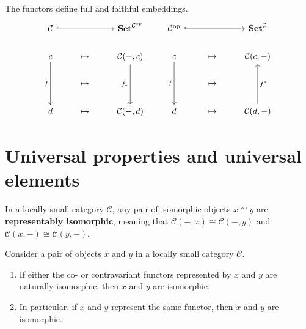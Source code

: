 \documentclass[12pt, oneside]{book}
\begin{document}
\begin{corollary}
    The functors define full and faithful embeddings.
    \begin{equation*}
        \begin{tikzcd}
            \mathcal{C} \arrow[rr,hook, ""] & & \mathbf{Set}^{\mathcal{C}^{\mathrm{op}}} \\
            c \arrow[dd, "f"']    & \mapsto & \mathcal{C}(-, c) \arrow[dd, "f_*"']\\
            & \mapsto & \\
            d          &  \mapsto & \mathcal{C}(-, d)
        \end{tikzcd}
        \quad \quad
        \begin{tikzcd}
            \mathcal{C}^{\mathrm{op}} \arrow[rr,hook, ""] & & \mathbf{Set}^{\mathcal{C}} \\
            c \arrow[dd, "f"']    & \mapsto & \mathcal{C}(c, -) \\
            & \mapsto & \\
            d          &  \mapsto & \mathcal{C}(d, -)\arrow[uu, "f^*"']
        \end{tikzcd}
    \end{equation*}
\end{corollary}












\section{Universal properties and universal elements}


\begin{definition}
    In a locally small category $\mathcal{C}$, any pair of isomorphic objects $x \cong y$ are \textbf{representably isomorphic}, meaning that $\mathcal{C}(-, x) \cong \mathcal{C}(-, y)$ and $\mathcal{C}(x,-) \cong \mathcal{C}(y,-)$.
\end{definition}



\begin{proposition}
    Consider a pair of objects $x$ and $y$ in a locally small category $\mathcal{C}$.
    \begin{enumerate}
        \item
              If either the co- or contravariant functors represented by $x$ and $y$ are naturally isomorphic, then $x$ and $y$ are isomorphic.
        \item
              In particular, if $x$ and $y$ represent the same functor, then $x$ and $y$ are isomorphic.
    \end{enumerate}
\end{proposition}
\end{document}
